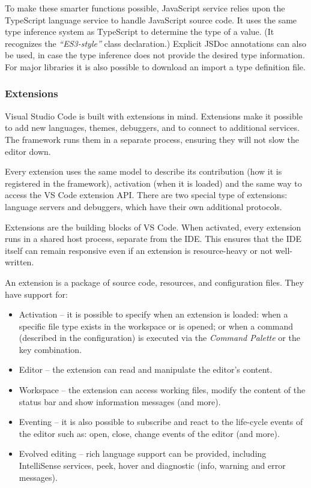 To make these smarter functions possible, JavaScript service relies upon the TypeScript language service to handle JavaScript source code. It uses the same type inference system as TypeScript to determine the type of a value. (It recognizes the \emph{``ES3-style''} class declaration.) Explicit JSDoc annotations can also be used, in case the type inference does not provide the desired type information. For major libraries it is also possible to download an import a type definition file.

\subsubsection{Extensions}
Visual Studio Code is built with extensions in mind. Extensions make it possible to add new languages, themes, debuggers, and to connect to additional services. The framework runs them in a separate process, ensuring they will not slow the editor down.

Every extension uses the same model to describe its contribution (how it is registered in the framework), activation (when it is loaded) and the same way to access the VS Code extension API. There are two special type of extensions: language servers and debuggers, which have their own additional protocols.

Extensions are the building blocks of VS Code. When activated, every extension runs in a shared host process, separate from the IDE. This ensures that the IDE itself can remain responsive even if an extension is resource-heavy or not well-written.

An extension is a package of source code, resources, and configuration files. They have support for:
\begin{itemize}[topsep=0pt]
  \item Activation -- it is possible to specify when an extension is loaded: when a specific file type exists in the workspace or is opened; or when a command (described in the configuration) is executed via the \emph{Command Palette} or the key combination.
  \item Editor -- the extension can read and manipulate the editor's content.
  \item Workspace -- the extension can access working files, modify the content of the status bar and show information messages (and more).
  \item Eventing -- it is also possible to subscribe and react to the life-cycle events of the editor such as: open, close, change events of the editor (and more).
  \item Evolved editing -- rich language support can be provided, including IntelliSense services, peek, hover and diagnostic (info, warning and error messages).
\end{itemize}

